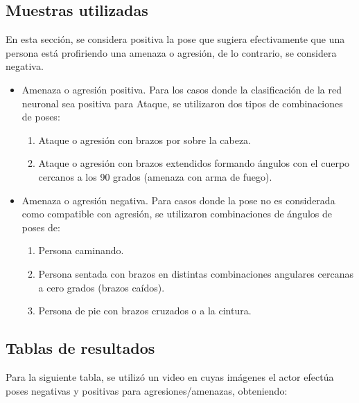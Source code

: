 \documentclass[a4paper,12pt,oneside,spanish]{book}
\begin{document}
\subsection{Muestras utilizadas}
En esta sección, se considera positiva la pose que sugiera efectivamente que una persona está profiriendo una amenaza o agresión, de lo contrario, se considera negativa.
\begin{itemize}
	\item Amenaza o agresión positiva.
	Para los casos donde la clasificación de la red neuronal sea positiva para Ataque, se utilizaron dos tipos de combinaciones de poses:
	\begin{enumerate}
		\item Ataque o agresión con brazos por sobre la cabeza.
		\item Ataque o agresión con brazos extendidos formando ángulos con el cuerpo cercanos a los 90 grados (amenaza con arma de fuego).
	\end{enumerate}\par
	\item Amenaza o agresión negativa.
	Para casos donde la pose no es considerada como compatible con agresión, se utilizaron combinaciones de ángulos de poses de:
	\begin{enumerate}
		\item Persona caminando.
		\item Persona sentada con brazos en distintas combinaciones angulares cercanas a cero grados (brazos caídos).
		\item Persona de pie con brazos cruzados o a la cintura.
	\end{enumerate}\par	
\end{itemize}\par

\subsection{Tablas de resultados}
Para la siguiente tabla, se utilizó un video en cuyas imágenes el actor efectúa poses negativas y positivas para agresiones/amenazas, obteniendo:
\end{document}
